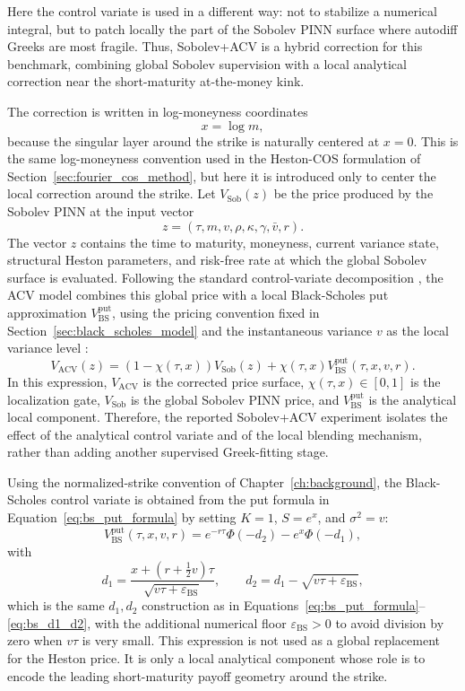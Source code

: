 Here the control variate is used in a different way: not to stabilize a numerical integral, but to patch locally the part of the Sobolev PINN surface where autodiff Greeks are most fragile. 
Thus, Sobolev+ACV is a hybrid correction for this benchmark, combining global Sobolev supervision with a local analytical correction near the short-maturity at-the-money kink.

The correction is written in log-moneyness coordinates
\[
x=\log m,
\]
because the singular layer around the strike is naturally centered at \(x=0\). This is the same log-moneyness convention used in the Heston-COS formulation of Section~\ref{sec:fourier_cos_method}, but here it is introduced only to center the local correction around the strike. Let \(V_{\mathrm{Sob}}(z)\) be the price produced by the Sobolev PINN at the input vector
\[
z=(\tau,m,v,\rho,\kappa,\gamma,\bar v,r).
\]
The vector \(z\) contains the time to maturity, moneyness, current variance state, structural Heston parameters, and risk-free rate at which the global Sobolev surface is evaluated. Following the standard control-variate decomposition \cite{glasserman2004montecarlo}, the ACV model combines this global price with a local Black-Scholes put approximation \(V_{\mathrm{BS}}^{\mathrm{put}}\), using the pricing convention fixed in Section~\ref{sec:black_scholes_model} and the instantaneous variance \(v\) as the local variance level \cite{black_scholes_1973}:
\begin{equation}
V_{\mathrm{ACV}}(z)
=
\left(1-\chi(\tau,x)\right)V_{\mathrm{Sob}}(z)
+\chi(\tau,x)
V_{\mathrm{BS}}^{\mathrm{put}}(\tau,x,v,r).
\label{eq:pinn_acv_decomposition}
\end{equation}
In this expression, \(V_{\mathrm{ACV}}\) is the corrected price surface, \(\chi(\tau,x)\in[0,1]\) is the localization gate, \(V_{\mathrm{Sob}}\) is the global Sobolev PINN price, and \(V_{\mathrm{BS}}^{\mathrm{put}}\) is the analytical local component. Therefore, the reported Sobolev+ACV experiment isolates the effect of the analytical control variate and of the local blending mechanism, rather than adding another supervised Greek-fitting stage.

Using the normalized-strike convention of Chapter~\ref{ch:background}, the Black-Scholes control variate is obtained from the put formula in Equation~\eqref{eq:bs_put_formula} by setting \(K=1\), \(S=e^x\), and \(\sigma^2=v\):
\begin{equation}
V_{\mathrm{BS}}^{\mathrm{put}}(\tau,x,v,r)
=
e^{-r\tau}\Phi(-d_2)-e^x\Phi(-d_1),
\end{equation}
with
\begin{equation}
d_1=\frac{x+(r+\frac{1}{2}v)\tau}{\sqrt{v\tau+\varepsilon_{\mathrm{BS}}}},
\qquad
d_2=d_1-\sqrt{v\tau+\varepsilon_{\mathrm{BS}}},
\end{equation}
which is the same \(d_1,d_2\) construction as in Equations~\eqref{eq:bs_put_formula}--\eqref{eq:bs_d1_d2}, with the additional numerical floor \(\varepsilon_{\mathrm{BS}}>0\) to avoid division by zero when \(v\tau\) is very small. This expression is not used as a global replacement for the Heston price. It is only a local analytical component whose role is to encode the leading short-maturity payoff geometry around the strike.

